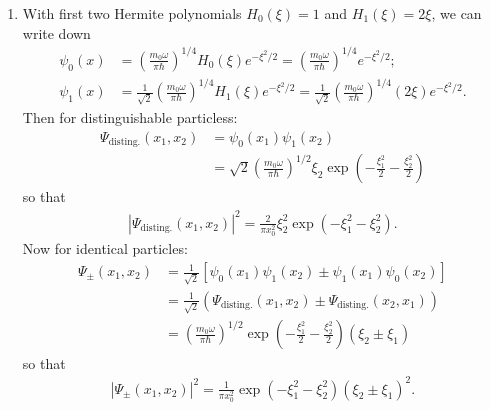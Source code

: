 \documentclass[11pt]{article}
\begin{document}
\begin{enumerate}[label=\textbf{\arabic*}.]
\begin{enumerate}
        \item %
            With first two Hermite polynomials $H_0(\xi)=1$ and $H_1(\xi) = 2\xi$, we can write down
            \begin{align*}
                \psi_0(x) &= \left(\frac{m_0 \omega}{\pi\hbar}\right)^{1/4} H_0(\xi) e^{-\xi^2/2} = \left(\frac{m_0 \omega}{\pi\hbar}\right)^{1/4} e^{-\xi^2/2} \text{;} \\
                \psi_1(x) &= \frac{1}{\sqrt{2}} \left(\frac{m_0 \omega}{\pi\hbar}\right)^{1/4} H_1(\xi) e^{-\xi^2/2} = \frac{1}{\sqrt{2}} \left(\frac{m_0 \omega}{\pi\hbar}\right)^{1/4} \left(2\xi\right) e^{-\xi^2/2} \text{.}
            \end{align*}
            Then for distinguishable particless:
            \begin{align*}
                \Psi_\mathrm{disting.}(x_1,x_2) &= \psi_0(x_1) \psi_1(x_2) \\
                &= \boxed{\sqrt{2} \left(\frac{m_0 \omega}{\pi\hbar}\right)^{1/2} \xi_2 \exp\left(-\frac{\xi_1^2}{2} - \frac{\xi_2^2}{2}\right)}
            \end{align*}
            so that
            \begin{align*}
                \boxed{|\Psi_\mathrm{disting.}(x_1,x_2)|^2 = \frac{2}{\pi x_0^2} \xi_2^2 \exp(-\xi_1^2 - \xi_2^2) \text{.}}
            \end{align*}
            Now for identical particles:
            \begin{align*}
                \Psi_{\pm}(x_1,x_2) &= \frac{1}{\sqrt{2}} \left[\psi_0(x_1)\psi_1(x_2) \pm \psi_1(x_1)\psi_0(x_2)\right] \\
                &= \frac{1}{\sqrt{2}} \left(\Psi_\mathrm{disting.}(x_1,x_2) \pm \Psi_\mathrm{disting.}(x_2,x_1)\right) \\
                &= \boxed{\left(\frac{m_0 \omega}{\pi\hbar}\right)^{1/2} \exp\left(-\frac{\xi_1^2}{2} - \frac{\xi_2^2}{2}\right) (\xi_2 \pm \xi_1)}
            \end{align*}
            so that
            \begin{align*}
                \boxed{|\Psi_{\pm}(x_1,x_2)|^2 = \frac{1}{\pi x_0^2} \exp(-\xi_1^2 - \xi_2^2) (\xi_2 \pm \xi_1)^2 \text{.}}
            \end{align*}


\end{enumerate}
\end{enumerate}
\end{document}
